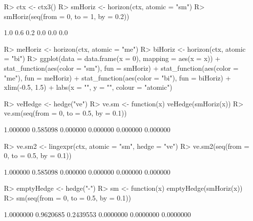 \documentclass{article}\usepackage[]{graphicx}\usepackage[]{color}
\begin{document}
\begin{Schunk}
% --begin: "horizon"
\begin{Sinput}
R> ctx <- ctx3()
R> smHoriz <- horizon(ctx, atomic = "sm")
R> smHoriz(seq(from = 0, to = 1, by = 0.2))
\end{Sinput}
\begin{Soutput}
[1] 1.0 0.6 0.2 0.0 0.0 0.0
\end{Soutput}
%
% --end: "horizon"
\end{Schunk}

\begin{Schunk}
\begin{Sinput}
R> meHoriz <- horizon(ctx, atomic = "me")
R> biHoriz <- horizon(ctx, atomic = "bi")
R> ggplot(data = data.frame(x = 0), mapping = aes(x = x)) + stat_function(aes(color = "sm"), 
       fun = smHoriz) + stat_function(aes(color = "me"), fun = meHoriz) + stat_function(aes(color = "bi"), 
       fun = biHoriz) + xlim(-0.5, 1.5) + labs(x = "", y = "", colour = "atomic\nexpression")
\end{Sinput}
\end{Schunk}

\begin{Schunk}
% --begin: "hedge"
\begin{Sinput}
R> veHedge <- hedge("ve")
R> ve.sm <- function(x) veHedge(smHoriz(x))
R> ve.sm(seq(from = 0, to = 0.5, by = 0.1))
\end{Sinput}
\begin{Soutput}
[1] 1.000000 0.585098 0.000000 0.000000 0.000000 0.000000
\end{Soutput}
%
% --end: "hedge"
\end{Schunk}


\begin{Schunk}
% --begin: "lingexpr"
\begin{Sinput}
R> ve.sm2 <- lingexpr(ctx, atomic = "sm", hedge = "ve")
R> ve.sm2(seq(from = 0, to = 0.5, by = 0.1))
\end{Sinput}
\begin{Soutput}
[1] 1.000000 0.585098 0.000000 0.000000 0.000000 0.000000
\end{Soutput}
%
% --end: "lingexpr"
\end{Schunk}

\begin{Schunk}
% --begin: "emptyhedge1"
\begin{Sinput}
R> emptyHedge <- hedge("-")
R> sm <- function(x) emptyHedge(smHoriz(x))
R> sm(seq(from = 0, to = 0.5, by = 0.1))
\end{Sinput}
\begin{Soutput}
[1] 1.0000000 0.9620685 0.2439553 0.0000000 0.0000000 0.0000000
\end{Soutput}
%
% --end: "emptyhedge1"
\end{Schunk}
\end{document}
